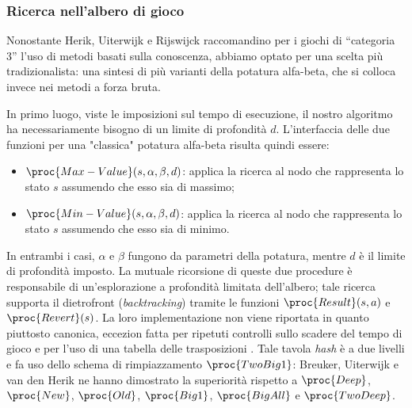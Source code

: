 \documentclass{article}
\begin{document}
\subsubsection{Ricerca nell'albero di gioco}

Nonostante Herik, Uiterwijk e Rijswijck \cite{VANDENHERIK2002277} raccomandino
per i giochi di ``categoria 3'' l'uso di metodi basati sulla conoscenza,
abbiamo optato per una scelta più tradizionalista: una sintesi di più varianti
della potatura alfa-beta, che si colloca invece nei metodi a forza bruta.

\begin{sloppypar}
In primo luogo, viste le imposizioni sul tempo di esecuzione, il nostro
algoritmo ha necessariamente bisogno di un limite di profondità $d$.
L'interfaccia delle due funzioni per una "classica" potatura alfa-beta
\cite{at.UBO029034619980101.200--202} risulta quindi essere:
\end{sloppypar}
\begin{itemize}
  \item $\proc{Max-Value}(s, \alpha, \beta, d)$: applica la ricerca
    al nodo che rappresenta lo stato $s$ assumendo che esso sia di massimo;
  \item $\proc{Min-Value}(s, \alpha, \beta, d)$: applica la ricerca
    al nodo che rappresenta lo stato $s$ assumendo che esso sia di minimo.
\end{itemize}
In entrambi i casi, $\alpha$ e $\beta$ fungono da parametri della potatura,
mentre $d$ è il limite di profondità imposto. La mutuale ricorsione di queste
due procedure è responsabile di un'esplorazione a profondità limitata
dell'albero; tale ricerca supporta il dietrofront
\cite{at.UBO029034619980101.108} (\emph{backtracking}) tramite le funzioni
$\proc{Result}(s, a)$ e $\proc{Revert}(s)$.
La loro implementazione non viene riportata in quanto piuttosto canonica,
eccezion fatta per ripetuti controlli sullo scadere del tempo di gioco e per
l'uso di una tabella delle trasposizioni \cite{CN020689428}. Tale tavola
\emph{hash} è a due livelli e fa uso dello schema di rimpiazzamento
$\proc{TwoBig1}$: Breuker, Uiterwijk e van den Herik
\cite{BREUKER-UITERWIJK-VANDENHERIK}
\cite{edsdbl.journals.icga.BreukerUH9619960101} ne hanno dimostrato la
superiorità rispetto a $\proc{Deep}$, $\proc{New}$, $\proc{Old}$, $\proc{Big1}$,
$\proc{BigAll}$ e $\proc{TwoDeep}$.
\end{document}
